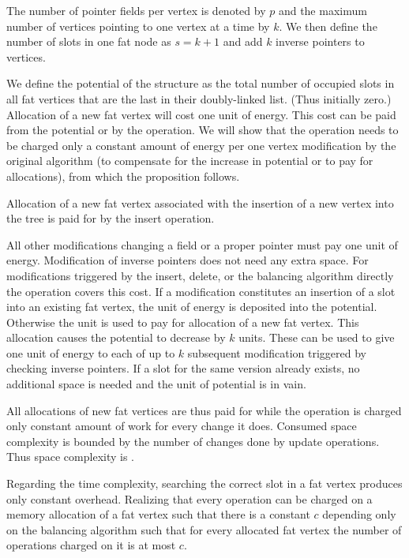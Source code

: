 \begin{myproof}
The number of pointer fields per vertex is denoted by $p$ and the maximum number of vertices pointing to one vertex at a time by $k$. 
We then define the number of slots in one fat node as $s = k + 1$ and add $k$ inverse pointers to vertices.

We define the potential of the structure as the total number of occupied slots in all fat vertices that are the last in their doubly-linked list. 
(Thus initially zero.) 
Allocation of a new fat vertex will cost one unit of energy. 
This cost can be paid from the potential or by the operation. 
We will show that the operation needs to be charged only a constant amount of energy per one vertex modification by the original algorithm (to compensate for the increase in potential or to pay for allocations), from which the proposition follows.

Allocation of a new fat vertex associated with the insertion of a new vertex into the tree is paid for by the insert operation.

All other modifications changing a field or a proper pointer must pay one unit of energy. 
Modification of inverse pointers does not need any extra space.
For modifications triggered by the insert, delete, or the balancing algorithm directly the operation covers this cost.
If a modification constitutes an insertion of a slot into an existing fat vertex, the unit of energy is deposited into the potential.
Otherwise the unit is used to pay for allocation of a new fat vertex. This allocation causes the potential to decrease by $k$ units. 
These can be used to give one unit of energy to each of up to $k$ subsequent modification triggered by checking inverse pointers.
If a slot for the same version already exists, no additional space is needed and the unit of potential is in vain.

All allocations of new fat vertices are thus paid for while the operation is charged only constant amount of work for every change it does.
Consumed space complexity is bounded by the number of changes done by update operations. Thus space complexity is . 
\end{myproof}

Regarding the time complexity, searching the correct slot in a fat vertex produces only constant overhead. 
Realizing that every operation can be charged on a memory allocation of a fat vertex such that there is a constant $c$ depending only on the balancing algorithm such that for every allocated fat vertex the number of operations charged on it is at most $c$.


